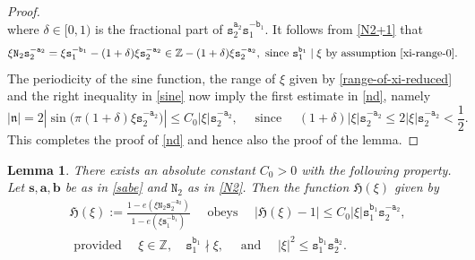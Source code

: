 \documentclass[12pt, twoside]{article}
\newtheorem{lemma}[theorem]{Lemma}
\theoremstyle{definition}
\numberwithin{equation}{section}
\begin{document}
\begin{proof}
\begin{equation}
\end{equation} 
where $\delta \in [0, 1)$ is the fractional part of $\mathtt s_2^{\mathtt a_2} \mathtt s_1^{-\mathtt b_1}$.  It follows from \eqref{N2+1} that 
\[ \xi \mathtt N_2 \mathtt s_2^{-\mathtt a_2} = \xi \mathtt s_1^{- \mathtt b_1} - (1 + \delta) \xi \mathtt s_2^{-\mathtt a_2} \in \mathbb Z - (1 + \delta) \xi \mathtt s_2^{-\mathtt a_2} , \text{ since } \mathtt s_1^{\mathtt b_1} \mid \xi \text{ by assumption \eqref{xi-range-0}}.\] 
The  periodicity of the sine function, the range of $\xi$ given by \eqref{range-of-xi-reduced} and the right inequality in \eqref{sine} now imply the first estimate in \eqref{nd}, namely
\[ |\mathfrak n| = 2 |\sin \bigl(\pi (1 + \delta) \xi \mathtt s_2^{-\mathtt a_2}\bigr)| \leq C_0 |\xi| \mathtt s_2^{-\mathtt a_2}, \quad
\text{ since } \quad (1 + \delta) |\xi| \mathtt s_2^{-\mathtt a_2} \leq  2|\xi| \mathtt s_2^{-\mathtt a_2} < \frac{1}{2}. \] 
This completes the proof of \eqref{nd} and hence also the proof of the lemma.  
\end{proof} 
\begin{lemma} \label{H-lemma}
There exists an absolute constant $C_0 > 0$ with the following property. Let $\mathbf s, \mathbf a, \mathbf b$ be as in \eqref{sabe} and $\mathtt N_2$ as in \eqref{N2}. Then the function $\mathfrak H(\xi)$ given by 
\begin{align} 
&\mathfrak H(\xi) := \frac{1 - e(\xi \mathtt N_2 \mathtt s_2^{-\mathtt a_2})}{1 - e(\xi \mathtt s_1^{-\mathtt b_1})} \quad \text{ obeys } \quad |\mathfrak H (\xi) - 1| \leq C_0 |\xi| \mathtt s_1^{\mathtt b_1} \mathtt s_2^{-\mathtt a_2},  \label{H}  \\ &\text{ provided } \quad \xi \in \mathbb Z, \quad  \mathtt s_1^{\mathtt b_1} \nmid \xi, \quad \text{ and } \quad |\xi|^2 \leq \mathtt s_1^{\mathtt b_1} \mathtt s_2^{\mathtt a_2}. \label{xi-range} 
\end{align} 
\end{lemma}  
\end{document}
